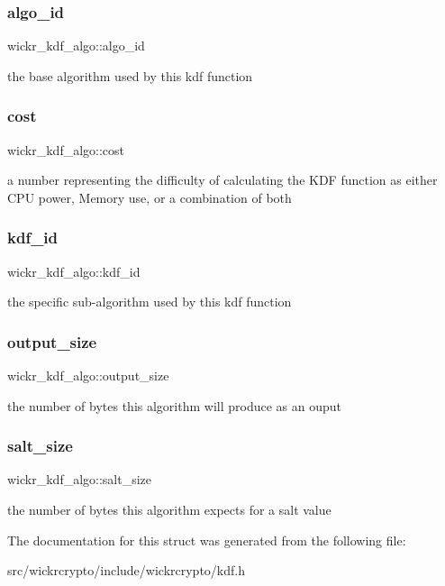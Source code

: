 \subsubsection{\texorpdfstring{algo\_id}{algo\_id}}
{\footnotesize\ttfamily wickr\+\_\+kdf\+\_\+algo\+::algo\+\_\+id}

the base algorithm used by this kdf function \mbox{\label{structwickr__kdf__algo_a3591ba4f7b6b916381ad28327a67d08c}} 
\subsubsection{\texorpdfstring{cost}{cost}}
{\footnotesize\ttfamily wickr\+\_\+kdf\+\_\+algo\+::cost}

a number representing the difficulty of calculating the K\+DF function as either C\+PU power, Memory use, or a combination of both \mbox{\label{structwickr__kdf__algo_a0cf9976901115634ddbb6193b6e326ba}} 
\subsubsection{\texorpdfstring{kdf\_id}{kdf\_id}}
{\footnotesize\ttfamily wickr\+\_\+kdf\+\_\+algo\+::kdf\+\_\+id}

the specific sub-\/algorithm used by this kdf function \mbox{\label{structwickr__kdf__algo_a75e5396b3c53817c6799dbf3107e36d6}} 
\subsubsection{\texorpdfstring{output\_size}{output\_size}}
{\footnotesize\ttfamily wickr\+\_\+kdf\+\_\+algo\+::output\+\_\+size}

the number of bytes this algorithm will produce as an ouput \mbox{\label{structwickr__kdf__algo_a9a6ccf9787e16898d1724292dab6593e}} 
\subsubsection{\texorpdfstring{salt\_size}{salt\_size}}
{\footnotesize\ttfamily wickr\+\_\+kdf\+\_\+algo\+::salt\+\_\+size}

the number of bytes this algorithm expects for a salt value 

The documentation for this struct was generated from the following file\+:\begin{DoxyCompactItemize}
\item 
src/wickrcrypto/include/wickrcrypto/kdf.\+h\end{DoxyCompactItemize}

